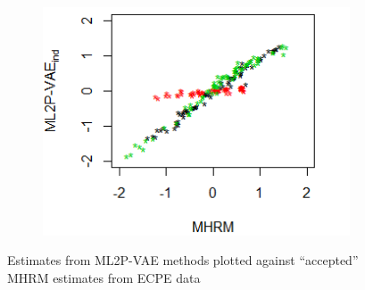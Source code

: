 \begin{figure}[h]
\begin{subfigure}{.32\textwidth}
    \end{subfigure}
    \begin{subfigure}{.32\textwidth}
      \centering
      \includegraphics[width=.9\linewidth]{img/ml_journal_results/ecpe/vae_ind_theta_ecpe.png}
    \end{subfigure}
    \caption{Estimates from ML2P-VAE methods plotted against ``accepted'' MHRM estimates from ECPE data}
    \label{fig:ecpe_cor}
\end{figure}

